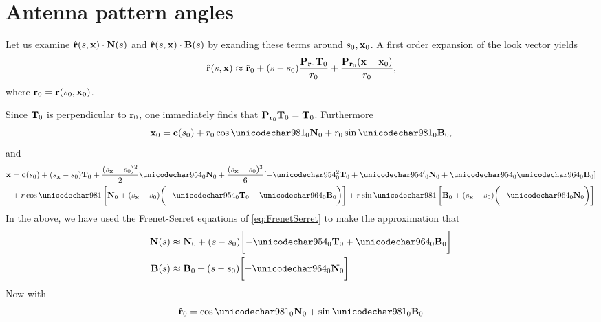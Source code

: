 \section{Antenna pattern angles}
\label{an:Angles}
Let us examine $\hat{\mathbf{r}}(s, \mathbf{\mathbf{x}})\cdot\mathbf{N}(s)$ and $\hat{\mathbf{r}}(s, \mathbf{\mathbf{x}})\cdot\mathbf{B}(s)$ by exanding these terms around $s_0, \mathbf{x}_0$. A first order expansion of the look vector yields
\begin{equation}
 \uRangeVectorParm \approx \uRangeVectorParmZero + (\parm-\parm_0)\frac{\mtx{P}_{\rangeVectorParmZero}\vct{T}_0}{\targetrangez} + \frac{\mtx{P}_{\rangeVectorParmZero}(\targetnoparm-\targetnoparmzero)}{\targetrangez},
\end{equation}
where $\mathbf{r}_0=\mathbf{r}(s_0, \mathbf{\mathbf{x}}_0)$.
\par
Since $\mathbf{T}_0$ is perpendicular to $\mathbf{r}_0$, one immediately finds that $\mtx{P}_{\rangeVectorParmZero}\vct{T}_0 = \vct{T}_0$. Furthermore
\begin{equation}
 \targetnoparmzero = \sat(\parm_0) + \targetrangez\cos\targetdepressionz\vct{N}_0 + \targetrangez\sin\targetdepressionz\vct{B}_0,
 \label{eq:pzero}
\end{equation}
and
\begin{equation}
\begin{split}
 \targetnoparm &= \sat(\parm_0) + (\targetxparm - \parm_0)\vct{T}_0 + \frac{(\targetxparm - \parm_0)^2}{2}\kappa_0\vct{N}_0 + \frac{(\targetxparm - \parm_0)^3}{6}[-\kappa^2_0\vct{T}_0 + {\kappa'}_0\vct{N}_0 + \kappa_0\tau_0\vct{B}_0]\\ 
 &+ \targetrange\cos\targetdepression\left[\vct{N}_0 + (\targetxparm - \parm_0)\biggl(-\kappa_0\vct{T}_0 + \tau_0\vct{B}_0\biggr)\right] + \targetrange\sin\targetdepression\left[\vct{B}_0 + (\targetxparm - \parm_0)\biggl(- \tau_0\vct{N}_0\biggr)\right]
 \label{eq:ptarget}
 \end{split}
\end{equation}
In the above, we have used the Frenet-Serret equations of \eqref{eq:FrenetSerret} to make the approximation that
\begin{align}
 \mtx{N}(\parm)&\approx\vct{N}_0 + (\parm - \parm_0)\biggl[-\kappa_0\vct{T}_0 + \tau_0\vct{B}_0\biggr]\\
 \mtx{B}(\parm)&\approx\vct{B}_0 + (\parm - \parm_0)\biggl[- \tau_0\vct{N}_0\biggr]
\end{align}
Now with
\begin{equation}
 \uRangeVectorParmZero = \cos\targetdepressionz\vct{N}_0 + \sin\targetdepressionz\vct{B}_0
\end{equation}
